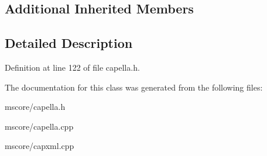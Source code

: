 \subsection*{Additional Inherited Members}


\subsection{Detailed Description}


Definition at line 122 of file capella.\+h.



The documentation for this class was generated from the following files\+:\begin{DoxyCompactItemize}
\item 
mscore/capella.\+h\item 
mscore/capella.\+cpp\item 
mscore/capxml.\+cpp\end{DoxyCompactItemize}
